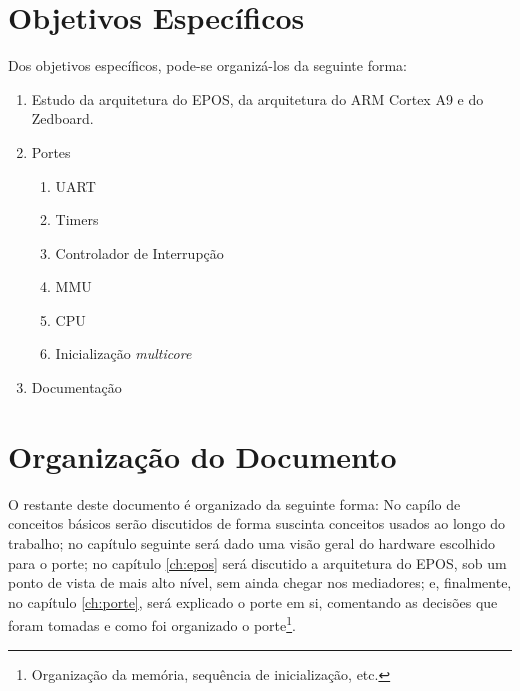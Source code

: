 \section{Objetivos Específicos}
Dos objetivos específicos, pode-se organizá-los da seguinte forma:

\begin{enumerate}
    \item Estudo da arquitetura do EPOS, da arquitetura do ARM Cortex A9 e do Zedboard.
    \item Portes
    \begin{enumerate}
		\item UART
        \item Timers
        \item Controlador de Interrupção
        \item MMU
		\item CPU
		\item Inicialização \emph{multicore}
    \end{enumerate}
    \item Documentação
\end{enumerate}

\section{Organização do Documento}

O restante deste documento é organizado da seguinte forma: No capílo de conceitos básicos serão discutidos de forma suscinta conceitos usados ao longo do trabalho; no capítulo seguinte será dado uma visão geral do hardware escolhido para o porte; no capítulo \ref{ch:epos} será discutido a arquitetura do EPOS, sob um ponto de vista de mais alto nível, sem ainda chegar nos mediadores; e, finalmente, no capítulo \ref{ch:porte}, será explicado o porte em si, comentando as decisões que foram tomadas e como foi organizado o porte\footnote{Organização da memória, sequência de inicialização, etc.}.
